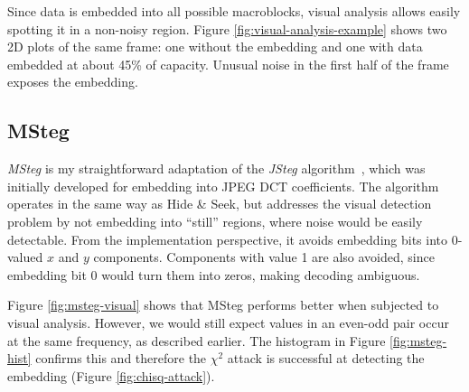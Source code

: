 \documentclass[12pt,british,twoside,notitlepage,usenames,dvipsnames,hypens,final]{report}
\numberwithin{equation}{section}
\numberwithin{figure}{section}
\begin{document}
Since data is embedded into all possible macroblocks, visual analysis allows easily spotting it in a non-noisy region. Figure \ref{fig:visual-analysis-example} shows two 2D plots of the same frame: one without the embedding and one with data embedded at about 45\% of capacity. Unusual noise in the first half of the frame exposes the embedding.  

\subsection{MSteg}
\label{msteg}

\emph{MSteg} is my straightforward adaptation of the \emph{JSteg} algorithm~\cite{bateman}, which was initially developed for embedding into JPEG DCT coefficients. The algorithm operates in the same way as Hide \& Seek, but addresses the visual detection problem by not embedding into ``still'' regions, where noise would be easily detectable. From the implementation perspective, it avoids embedding bits into 0-valued $x$ and $y$ components. Components with value 1 are also avoided, since embedding bit 0 would turn them into zeros, making decoding ambiguous.

Figure \ref{fig:msteg-visual} shows that MSteg performs better when subjected to visual analysis. However, we would still expect values in an even-odd pair occur at the same frequency, as described earlier. The histogram in Figure \ref{fig:msteg-hist} confirms this and therefore the $\chi^2$ attack is successful at detecting the embedding (Figure \ref{fig:chisq-attack}).
\end{document}
